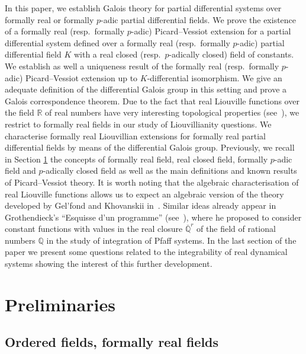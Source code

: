 \documentclass[10pt,a4paper]{amsart}
\numberwithin{equation}{section}
\newcommand{\R}{\mathbb{R}}
\newcommand{\Q}{\mathbb{Q}}
\begin{document}
In this paper, we establish Galois theory for partial differential systems over formally real or formally $p$-adic partial differential fields. We prove the existence of a formally real (resp.\ formally $p$-adic) Picard--Vessiot extension for a partial differential system defined over a formally real (resp.\ formally $p$-adic) partial differential field $K$ with a real closed (resp.\ $p$-adically closed) field of constants. We establish as well a uniqueness result of the formally real (resp.\ formally $p$-adic) Picard--Vessiot extension up to $K$-differential isomorphism. We give an adequate definition of the differential Galois group in this setting and prove a Galois correspondence theorem. Due to the fact that real Liouville functions over the field $\R$ of real numbers have very interesting topological properties (see~\cite{GK,Kh}), we restrict to formally real fields in our study of Liouvillianity questions. We characterise formally real Liouvillian extensions for formally real partial differential fields by means of the differential Galois group. Previously, we recall in Section \ref{prelim} the concepts of formally real field, real closed field, formally $p$-adic field and $p$-adically closed field as well as the main definitions and known results of Picard--Vessiot theory. It is worth noting that the algebraic characterisation of real Liouville functions allows us to expect an algebraic version of the theory developed by Gel'fond and Khovanskii in~\cite{GK,Kh}. Similar ideas already appear in Grothendieck's ``Esquisse d'un programme'' (see~\cite[p.~272]{GGA}), where he proposed to consider constant functions with values in the real closure $\overline{\Q}^r$ of the field of rational numbers $\Q$ in the study of integration of Pfaff systems. In the last section of the paper we present some questions related to the integrability of real dynamical systems showing the interest of this further development.



\section{Preliminaries}\label{prelim}

\subsection{Ordered fields, formally real fields}
\end{document}
